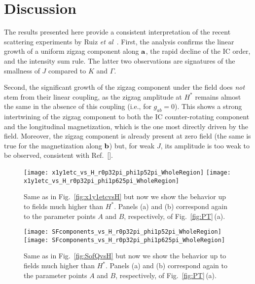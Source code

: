 \documentclass[prx,aps,groupedaddress,twocolumn]{revtex4-1}
\def\cdbl{\color{darkblue}}
\begin{document}
\vspace*{-0.25cm}
\section{Discussion}
\vspace*{-0.25cm}
The results presented here provide a consistent interpretation of the recent scattering experiments by Ruiz {\it et al}~\cite{Ruiz2017}. 
%
First, the analysis confirms the linear growth of a uniform zigzag component along ${\bf a}$, the rapid decline of the IC order, and the intensity sum rule. 
%
The latter two observations are signatures of the smallness of $J$ compared to $K$ and $\Gamma$.


Second, the significant growth of the zigzag component under the field does {\it not} stem from their linear coupling, as the zigzag amplitude at $H^\ast$ remains almost the same in the absence of this coupling (i.e., for $g_{ab}\!=\!0$). 
%
This shows a strong intertwining of the zigzag component to both the IC counter-rotating component and the longitudinal magnetization, which is the one most directly driven by the field.
%
Moreover, the zigzag component is already present at zero field (the same is true for the magnetization along ${\bf b}$) but, for weak $J$, its amplitude is too weak to be observed, consistent with Ref.~[]. 


\begin{figure}[!t]
\texttt{[image: x1y1etc\_vs\_H\_r0p32pi\_phi1p52pi\_WholeRegion]}
\texttt{[image: x1y1etc\_vs\_H\_r0p32pi\_phi1p625pi\_WholeRegion]}
\caption{Same as in Fig.~\ref{fig:x1y1etcvsH} but now we show the behavior up to fields much higher than $H^\ast$. Panels (a) and (b) correspond again to the parameter points $A$ and $B$, respectively, of Fig.~\ref{fig:PT}\,(a).}
\vspace*{-0.25cm}
\label{fig:x1y1etcvsH_WholeRegion}
\end{figure}  


\begin{figure}[!t]
\texttt{[image: SFcomponents\_vs\_H\_r0p32pi\_phi1p52pi\_WholeRegion]}
\texttt{[image: SFcomponents\_vs\_H\_r0p32pi\_phi1p625pi\_WholeRegion]}
\caption{Same as in Fig.~\ref{fig:SofQvsH} but now we show the behavior up to fields much higher than $H^\ast$. Panels (a) and (b) correspond again to the parameter points $A$ and $B$, respectively, of Fig.~\ref{fig:PT}\,(a).}
\vspace*{-0.25cm}
\label{fig:SofQvsH_WholeRegion}
\end{figure}  
\end{document}
